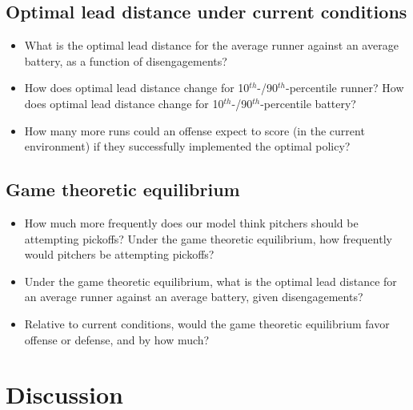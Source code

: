 \documentclass{article}
\begin{document}
        \subsection{Optimal lead distance under current conditions}
            \begin{itemize}
                \item What is the optimal lead distance for the average runner against an average battery, as a function of disengagements?
                \item How does optimal lead distance change for 10$^{th}$-/90$^{th}$-percentile runner?
                How does optimal lead distance change for 10$^{th}$-/90$^{th}$-percentile battery?
                \item How many more runs could an offense expect to score (in the current environment) if they successfully implemented the optimal policy?
            \end{itemize}
        \subsection{Game theoretic equilibrium}
            \begin{itemize}
                \item How much more frequently does our model think pitchers should be attempting pickoffs? Under the game theoretic equilibrium, how frequently would pitchers be attempting pickoffs?
                \item Under the game theoretic equilibrium, what is the optimal lead distance for an average runner against an average battery, given disengagements?
                \item Relative to current conditions, would the game theoretic equilibrium favor offense or defense, and by how much?
            \end{itemize}
    \section{Discussion}
\end{document}
